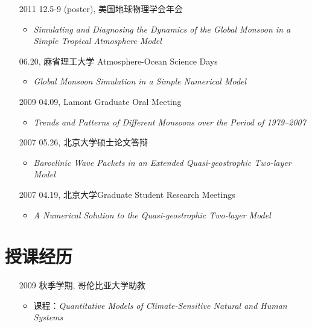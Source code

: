 \documentclass[11pt]{article}
\newcommand{\meetingName}[1]{#1}
\newcommand{\ptitle}[1]{\textit{#1}}
\begin{document}
\begin{CJK*}{UTF8}{gkai}
\begin{itemize}[leftmargin=10ex,label={},noitemsep,nolistsep]
	\item [2011] 12.5-9 (poster), \meetingName{美国地球物理学会年会}
	\begin{itemize}[leftmargin=4ex,label={},noitemsep,nolistsep]
		\item \ptitle{Simulating and Diagnosing the Dynamics of the Global Monsoon in a Simple Tropical Atmosphere Model}
		\end{itemize} 
	 
	\item [\phantom{2011}] 06.20, \meetingName{麻省理工大学 Atmosphere-Ocean Science Days}
	\begin{itemize}[leftmargin=4ex,label={},noitemsep,nolistsep]
		\item \ptitle{Global Monsoon Simulation in a Simple Numerical Model}
		\end{itemize}
	
	\item [2009] 04.09, \meetingName{Lamont Graduate Oral Meeting}
	\begin{itemize}[leftmargin=4ex,label={},noitemsep,nolistsep]
		\item \ptitle{Trends and Patterns of Different Monsoons over the Period of 1979--2007}
		\end{itemize}
	
	\item [2007]05.26,  \meetingName{北京大学硕士论文答辩}
	\begin{itemize}[leftmargin=4ex,label={},noitemsep,nolistsep]
		\item \ptitle{Baroclinic Wave Packets in an Extended Quasi-geostrophic Two-layer Model}
		\end{itemize}
	
	\item [2007]04.19, \meetingName{北京大学Graduate Student Research Meetings}
	\begin{itemize}[leftmargin=4ex,label={},noitemsep,nolistsep]
		\item \ptitle{A Numerical Solution to the Quasi-geostrophic Two-layer Model}
		\end{itemize}
		
\end{itemize}



\section{授课经历} 
\begin{itemize}[leftmargin=10ex,label={},noitemsep,nolistsep]
	\item[2009] 秋季学期, 哥伦比亚大学助教
	\begin{itemize}[leftmargin=0ex,label={},noitemsep,nolistsep]
		\item  课程：\textit{Quantitative Models of Climate-Sensitive Natural and Human Systems}
		\end{itemize}
		

\end{itemize}
\end{CJK*}
\end{document}
